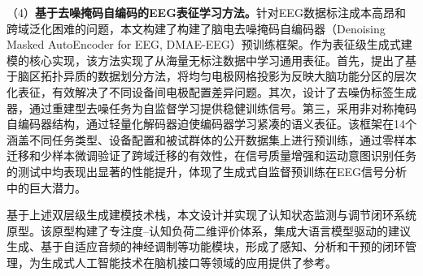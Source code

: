 \begin{cabstract}
（4）\textbf{基于去噪掩码自编码的EEG表征学习方法。}针对EEG数据标注成本高昂和跨域泛化困难的问题，本文构建了构建了脑电去噪掩码自编码器（Denoising Masked AutoEncoder for EEG, DMAE-EEG）预训练框架。作为表征级生成式建模的核心实现，该方法实现了从海量无标注数据中学习通用表征。首先，提出了基于脑区拓扑异质的数据划分方法，将均匀电极网格投影为反映大脑功能分区的层次化表征，有效解决了不同设备间电极配置差异问题。其次，设计了去噪伪标签生成器，通过重建型去噪任务为自监督学习提供稳健训练信号。第三，采用非对称掩码自编码器结构，通过轻量化解码器迫使编码器学习紧凑的语义表征。该框架在14个涵盖不同任务类型、设备配置和被试群体的公开数据集上进行预训练，通过零样本迁移和少样本微调验证了跨域迁移的有效性，在信号质量增强和运动意图识别任务的测试中均表现出显著的性能提升，体现了生成式自监督预训练在EEG信号分析中的巨大潜力。

基于上述双层级生成建模技术栈，本文设计并实现了认知状态监测与调节闭环系统原型。该原型构建了专注度--认知负荷二维评价体系，集成大语言模型驱动的建议生成、基于自适应音频的神经调制等功能模块，形成了感知、分析和干预的闭环管理，为生成式人工智能技术在脑机接口等领域的应用提供了参考。
\end{cabstract}


